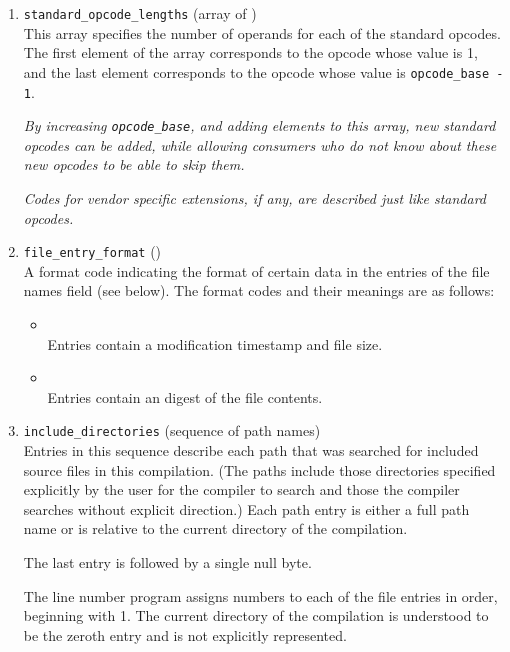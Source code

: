 \begin{enumerate}[1. ]
\item \texttt{standard\_opcode\_lengths} (array of ) \\
This array specifies the number of  operands for each
of the standard opcodes. The first element of the array
corresponds to the opcode whose value is 1, and the last
element corresponds to the opcode whose value 
is \texttt{opcode\_base - 1}.

\textit{By increasing \texttt{opcode\_base}, and adding elements to this array,
new standard opcodes can be added, while allowing consumers who
do not know about these new opcodes to be able to skip them.}

\textit{Codes for vendor specific extensions, if any, are described
just like standard opcodes.}

\item \texttt{file\_entry\_format} () \\
A format code indicating the format of certain data in the 
entries of the file names field (see below). The format codes 
and their meanings are as follows:
\begin{itemize}
\item \DWLNFtimestampsizeTARG \\
Entries contain a modification timestamp and file size.
\item \DWLNFMDfiveTARG \\
Entries contain an \MDfive{} digest of the file contents.
\end{itemize}

\item \texttt{include\_directories} (sequence of path names) \\
Entries 
in this sequence describe each path that was searched
for included source files in this compilation. (The paths
include those directories specified explicitly by the user for
the compiler to search and those the compiler searches without
explicit direction.) Each path entry is either a full path name
or is relative to the current directory of the compilation.

The last entry is followed by a single null byte.

The line number program assigns numbers to each of the file
entries in order, beginning with 1. The current directory of
the compilation is understood to be the zeroth entry and is
not explicitly represented.


\end{enumerate}
